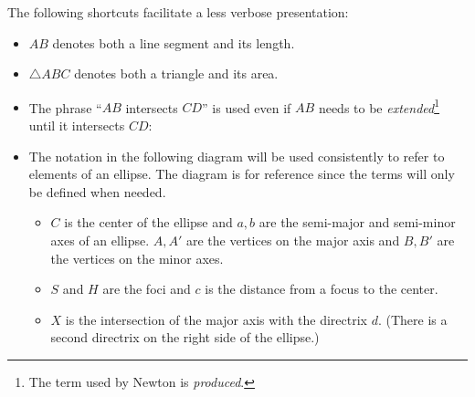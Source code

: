 The following shortcuts facilitate a less verbose presentation:
\begin{itemize}

\item $AB$ denotes both a line segment and its length.
\item $\triangle ABC$ denotes both a triangle and its area.
\item The phrase ``$AB$ intersects $CD$'' is used even if $AB$ needs to be \emph{extended}\footnote{The term used by Newton is \emph{produced}.} until it intersects $CD$:
\begin{center}
\end{center}
\item The notation in the following diagram will be used consistently to refer to elements of an ellipse. The diagram is for reference since the terms will only be defined when needed.
\begin{itemize}
\item $C$ is the center of the ellipse and $a,b$ are the semi-major and semi-minor axes of an ellipse. $A,A'$ are the vertices on the major axis and $B,B'$ are the vertices on the minor axes.
\item $S$ and $H$ are the foci and $c$ is the distance from a focus to the center.
\item $X$ is the intersection of the major axis with the directrix $d$. (There is a second directrix on the right side of the ellipse.)
\end{itemize}
\end{itemize}

